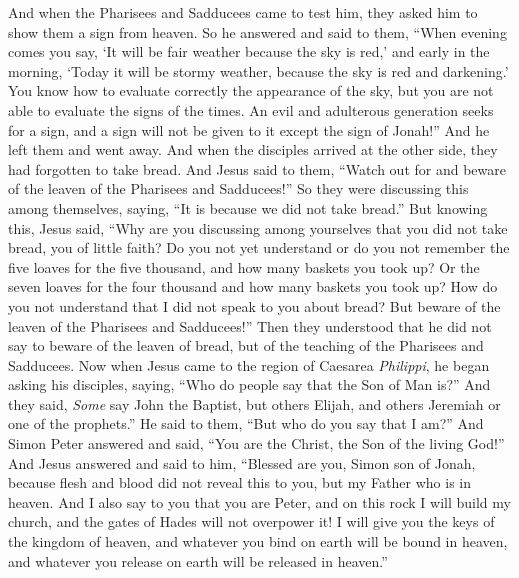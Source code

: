 \begin{biblechapter} %
 And when the Pharisees and Sadducees came to test him, they asked him to show them a sign from heaven.
\verse So he answered and said to them, “When evening comes you say, ‘It will be fair weather because the sky is red,’
\verse and early in the morning, ‘Today it will be stormy weather, because the sky is red and darkening.’ You know how to evaluate correctly the appearance of the sky, but you are not able to evaluate the signs of the times.
\verse An evil and adulterous generation seeks for a sign, and a sign will not be given to it except the sign of Jonah!” And he left them and went away.
 And when the disciples arrived at the other side, they had forgotten to take bread.
\verse And Jesus said to them, “Watch out for and beware of the leaven of the Pharisees and Sadducees!”
\verse So they were discussing this among themselves, saying, “It is because we did not take bread.”
\verse But knowing this, Jesus said, “Why are you discussing among yourselves that you did not take bread, you of little faith?
\verse Do you not yet understand or do you not remember the five loaves for the five thousand, and how many baskets you took up?
\verse Or the seven loaves for the four thousand and how many baskets you took up?
\verse How do you not understand that I did not speak to you about bread? But beware of the leaven of the Pharisees and Sadducees!”
\verse Then they understood that he did not say to beware of the leaven of bread, but of the teaching of the Pharisees and Sadducees.
 Now when Jesus came to the region of Caesarea \textit{Philippi}, he began asking his disciples, saying, “Who do people say that the Son of Man is?”
\verse And they said, \textit{Some} say John the Baptist, but others Elijah, and others Jeremiah or one of the prophets.”
\verse He said to them, “But who do you say that I am?”
\verse And Simon Peter answered and said, “You are the Christ, the Son of the living God!”
\verse And Jesus answered and said to him, “Blessed are you, Simon son of Jonah, because flesh and blood did not reveal this to you, but my Father who is in heaven.
\verse And I also say to you that you are Peter, and on this rock I will build my church, and the gates of Hades will not overpower it!
\verse I will give you the keys of the kingdom of heaven, and whatever you bind on earth will be bound in heaven, and whatever you release on earth will be released in heaven.”

\end{biblechapter}
